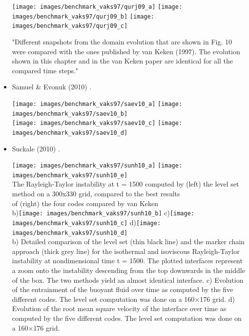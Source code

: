 \begin{itemize}
\begin{center}
\texttt{[image: images/benchmark\_vaks97/qurj09\_a]}
\texttt{[image: images/benchmark\_vaks97/qurj09\_b]}
\texttt{[image: images/benchmark\_vaks97/qurj09\_c]}
\end{center}

"Different snapshots from the domain evolution that are shown in Fig. 10 were compared with the 
ones published by van Keken \etal (1997). The evolution shown in this chapter and 
in the van Keken paper are identical for all the compared time steps."

\item Samuel \& Evonuk (2010) \cite{saev10}.

\begin{center}
\texttt{[image: images/benchmark\_vaks97/saev10\_a]}
\texttt{[image: images/benchmark\_vaks97/saev10\_b]}\\
\texttt{[image: images/benchmark\_vaks97/saev10\_c]}
\texttt{[image: images/benchmark\_vaks97/saev10\_d]}
\end{center}

\item Suckale \etal (2010) \cite{sunh10}.

\begin{center}
\texttt{[image: images/benchmark\_vaks97/sunh10\_a]}
\texttt{[image: images/benchmark\_vaks97/sunh10\_e]}\\
{\captionfont The Rayleigh-Taylor instability at t = 1500 computed by (left) 
the level set method on a 300x330 grid, compared to the best results\\ 
of (right) the four codes compared by van Keken \etal }\\
b)\texttt{[image: images/benchmark\_vaks97/sunh10\_b]}
c)\texttt{[image: images/benchmark\_vaks97/sunh10\_c]}
d)\texttt{[image: images/benchmark\_vaks97/sunh10\_d]}\\
{\captionfont 
b) Detailed comparison of the level set (thin black line) and the marker chain 
approach (thick grey line) for the isothermal and isoviscous Rayleigh-Taylor 
instability at nondimensional time t = 1500. The plotted interfaces represent a 
zoom onto the instability descending from the top downwards in the middle of the box. 
The two methods yield an almost identical interface. 
c) Evolution of the entrainment of the buoyant fluid over time as computed by 
the five different codes. The level set computation was done on a 160$\times$176 grid.
d) Evolution of the root mean square velocity of the interface over time 
as computed by the five different codes. The level set computation was done on a 160$\times$176 grid.}
\end{center}


\end{itemize}
